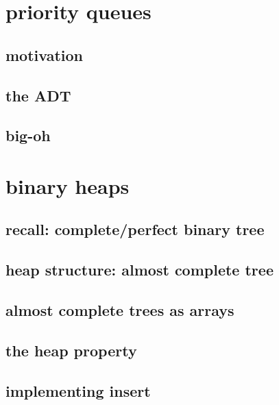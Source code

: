 
\begin{frame}
    \titlepage
\end{frame}

\section{priority queues}

\subsection{motivation}

\subsection{the ADT}

\subsection{big-oh}

\section{binary heaps}

\subsection{recall: complete/perfect binary tree}

\subsection{heap structure: almost complete tree}

\subsection{almost complete trees as arrays}


\subsection{the heap property}

\subsection{implementing insert}

